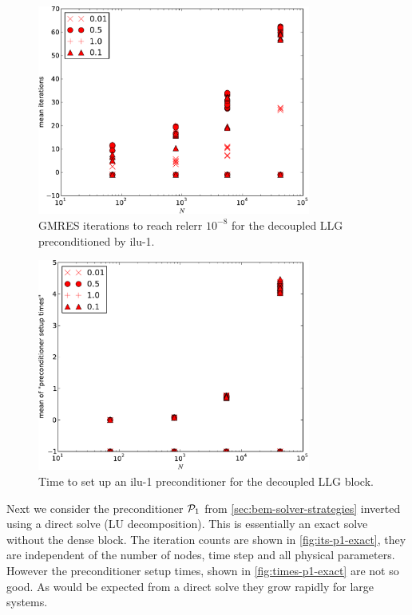 \begin{figure}
  \centering
  \includegraphics[width=0.8\textwidth]{plots/linear_solvers/ilu-1decoupleddummy-meanofnsolveritersvsinitialnnode.pdf}
  \caption{GMRES iterations to reach relerr $10^{-8}$ for the decoupled LLG preconditioned by ilu-1.}
  \label{fig:its-ilu-decoupled}
\end{figure}

\begin{figure}
  \centering
  \includegraphics[width=0.8\textwidth]{plots/linear_solvers/ilu-1decoupleddummy-meanofpreconditionersetuptimesvsinitialnnode.pdf}
  \caption{Time to set up an ilu-1 preconditioner for the decoupled LLG block.}
  \label{fig:times-ilu-decoupled}
\end{figure}


Next we consider the preconditioner $\mathcal{P}_1$ from \cref{sec:bem-solver-strategies} inverted using a direct solve (LU decomposition).
This is essentially an exact solve without the dense block.
The iteration counts are shown in \cref{fig:its-p1-exact}, they are independent of the number of nodes, time step and all physical parameters.
However the preconditioner setup times, shown in \cref{fig:times-p1-exact} are not so good.
As would be expected from a direct solve they grow rapidly for large systems.

